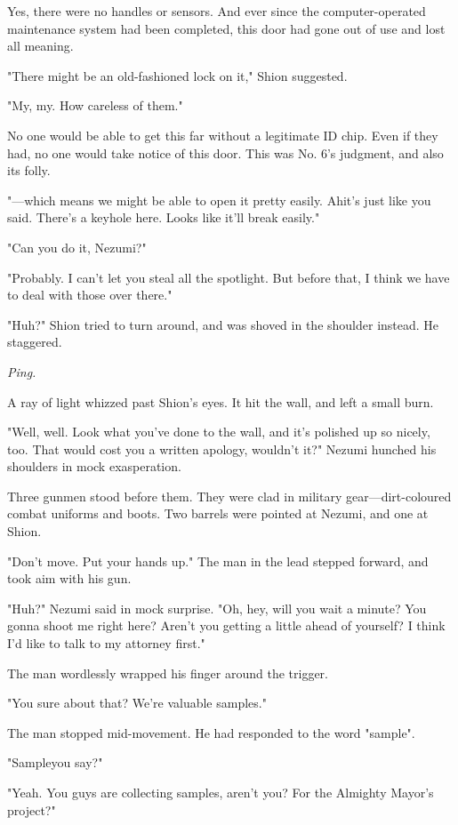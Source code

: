 Yes, there were no handles or sensors. And ever since the
computer-operated maintenance system had been completed, this door had
gone out of use and lost all meaning.

"There might be an old-fashioned lock on it," Shion suggested.

"My, my. How careless of them."

No one would be able to get this far without a legitimate ID chip. Even
if they had, no one would take notice of this door. This was No. 6's
judgment, and also its folly.

"---which means we might be able to open it pretty easily. Ah\el it's just
like you said. There's a keyhole here. Looks like it'll break easily."

"Can you do it, Nezumi?"

"Probably. I can't let you steal all the spotlight. But before that, I
think we have to deal with those over there."

"Huh?" Shion tried to turn around, and was shoved in the shoulder
instead. He staggered.

\emph{Ping.}

A ray of light whizzed past Shion's eyes. It hit the wall, and left a
small burn.

"Well, well. Look what you've done to the wall, and it's polished up so
nicely, too. That would cost you a written apology, wouldn't it?" Nezumi
hunched his shoulders in mock exasperation.

Three gunmen stood before them. They were clad in military
gear---dirt-coloured combat uniforms and boots. Two barrels were pointed
at Nezumi, and one at Shion.

"Don't move. Put your hands up." The man in the lead stepped forward,
and took aim with his gun.

"Huh?" Nezumi said in mock surprise. "Oh, hey, will you wait a minute?
You gonna shoot me right here? Aren't you getting a little ahead of
yourself? I think I'd like to talk to my attorney first."

The man wordlessly wrapped his finger around the trigger.

"You sure about that? We're valuable samples."

The man stopped mid-movement. He had responded to the word "sample".

"Sample\el you say?"

"Yeah. You guys are collecting samples, aren't you? For the Almighty
Mayor's project?"

